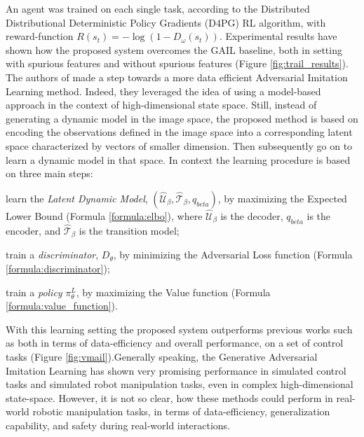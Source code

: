An agent was trained on each single task, according to the Distributed Distributional Deterministic Policy Gradients (D4PG) \cite{barth2018d4pg} RL algorithm, with reward-function $R(s_{t}) = - \log(1-D_{\omega}(s_{t}))$. Experimental results have shown how the proposed system overcomes the GAIL \cite{ho2016gail} baseline, both in setting with spurious features and without spurious features (Figure \ref{fig:trail_results}). The authors of \cite{rafailov2021visual_ail} made a step towards a more data efficient Adversarial Imitation Learning method. Indeed, they leveraged the idea of using a model-based approach in the context of high-dimensional state space. Still, instead of generating a dynamic model in the image space, the proposed method is based on encoding the observations defined in the image space into a corresponding latent space characterized by vectors of smaller dimension. Then subsequently go on to learn a dynamic model in that space. In context the learning procedure is based on three main steps: \begin{enumerate*}[label=\textbf{(\arabic*)}]
    \item learn the \textit{Latent Dynamic Model}, $(\hat{\mathcal{U}}_{\beta},\hat{\mathcal{T}}_{\beta}, q_{beta})$, by maximizing the Expected Lower Bound (Formula \ref{formula:elbo}), where $\hat{\mathcal{U}}_{\beta}$ is the decoder, $q_{beta}$ is the encoder, and $\hat{\mathcal{T}}_{\beta}$ is the transition model;
    \item train a \textit{discriminator}, $D_{\theta}$, by minimizing the Adversarial Loss function (Formula \ref{formula:discriminator});
    \item train a \textit{policy} $\pi^{L}_{\theta}$, by maximizing the Value function (Formula \ref{formula:value_function}).
\end{enumerate*} 

%

\noindent With this learning setting the proposed system outperforms previous works such as \cite{reddy2019sqil,kostrikov2018discriminator} both in terms of data-efficiency and overall performance, on a set of control tasks (Figure \ref{fig:vmail}).Generally speaking, the Generative Adversarial Imitation Learning has shown very promising performance in simulated control tasks and simulated robot manipulation tasks, even in complex high-dimensional state-space. However, it is not so clear, how these methods could perform in real-world robotic manipulation tasks, in terms of data-efficiency, generalization capability, and safety during real-world interactions.
